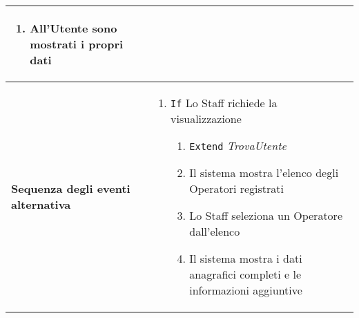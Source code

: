 \documentclass[a4paper]{report}
\begin{document}
\begin{table}[H]
\begin{tabular}{|p{3.9cm}|p{9.9cm}|}
\begin{enumerate}[leftmargin=14pt,label=\arabic*.,labelsep=0.5em,topsep=0pt,partopsep=0pt,parsep=0pt,itemsep=0pt]
    \item All’Utente sono mostrati i propri dati
    \end{enumerate} \\ \hline
\textbf{Sequenza degli eventi alternativa} & \begin{enumerate}[leftmargin=14pt,label=\arabic*.,labelsep=0.5em,topsep=0pt,partopsep=0pt,parsep=0pt,itemsep=0pt] 
    \item \texttt{If} Lo Staff richiede la visualizzazione
    \begin{enumerate}[label=\arabic{enumi}.\arabic*.,leftmargin=22pt,labelsep=0.5em,topsep=0pt,partopsep=0pt,parsep=0pt,itemsep=0pt]
        \item \texttt{Extend} \textit{TrovaUtente} 
        \item Il sistema mostra l’elenco degli Operatori registrati
        \item Lo Staff seleziona un Operatore dall’elenco
        \item Il sistema mostra i dati anagrafici completi e le informazioni aggiuntive 
    \end{enumerate}
\end{enumerate}\\ \hline
\end{tabular}
\end{table}
\end{document}
